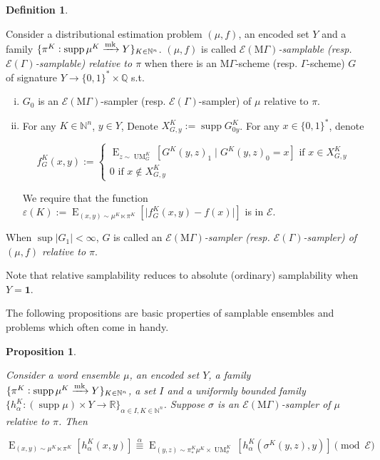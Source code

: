 \documentclass{article}
\numberwithin{equation}{section}
\theoremstyle{definition}
\newtheorem{definition}{Definition}[section]
\theoremstyle{plain}
\newtheorem{proposition}{Proposition}[section]
\newcommand{\Bool}{\{0,1\}}
\newcommand{\Words}{{\Bool^*}}
\DeclareMathOperator{\Supp}{supp}
\DeclareMathOperator{\E}{E}
\DeclareMathOperator{\UM}{UM}
\newcommand{\Nats}{\mathbb{N}}
\newcommand{\Rats}{\mathbb{Q}}
\newcommand{\Reals}{\mathbb{R}}
\newcommand{\Abs}[1]{\lvert #1 \rvert}
\newcommand{\MGrow}{\mathrm{M}\Gamma}
\newcommand{\Fall}{\mathcal{E}}
\newcommand{\EG}{\Fall(\Gamma)}
\newcommand{\EMG}{\Fall(\MGrow)}
\newcommand{\Markov}{\xrightarrow{\textnormal{mk}}}
\begin{document}
\begin{samepage}
\begin{definition}
\label{def:smp_prob_rel}

Consider a distributional estimation problem $(\mu,f)$, an encoded set $Y$ and a family $\{\pi^K: \Supp \mu^{K} \Markov Y\}_{K \in \Nats^n}$. $(\mu,f)$ is called \emph{$\EMG$-samplable (resp. $\EG$-samplable) relative to $\pi$} when there is an $\MGrow$-scheme (resp. $\Gamma$-scheme) $G$ of signature $Y \rightarrow \Words \times \Rats$ s.t.

\begin{enumerate}[(i)]

\item $G_0$ is an $\EMG$-sampler (resp. $\EG$-sampler) of $\mu$ relative to $\pi$.

\item For any $K \in \Nats^n$, $y \in Y$, Denote $X_{G,y}^K:=\Supp G_{0y}^K$. For any ${x \in \Words}$, denote 

$$f_G^K(x,y):=\begin{cases}\E_{z \sim\UM_G^K}[G^K(y,z)_1 \mid G^K(y,z)_0 = x] \text{ if } x \in X_{G,y}^K \\ 0 \text{ if } x \not\in X_{G,y}^K \end{cases}$$

We require that the function ${\varepsilon(K):=\E_{(x,y) \sim \mu^{K} \ltimes \pi^K}[\Abs{f_G^K(x,y)-f(x)}]}$ is in $\Fall$.

\end{enumerate}

When $\sup{\Abs{G_1}} < \infty$, $G$ is called an \emph{$\EMG$-sampler (resp. $\EG$-sampler) of $(\mu,f)$ relative to $\pi$}.

\end{definition}
\end{samepage}

Note that relative samplability reduces to absolute (ordinary) samplability when $Y=\bm{1}$.

The following propositions are basic properties of samplable ensembles and problems which often come in handy.

\begin{samepage}
\begin{proposition}
\label{prp:smp}

Consider a word ensemble $\mu$, an encoded set $Y$, a family ${\{\pi^K: \Supp \mu^{K} \Markov Y\}_{K \in \Nats^n}}$, a set ${I}$ and a uniformly bounded family ${\{h_\alpha^K: (\Supp \mu) \times Y \rightarrow \Reals\}_{\alpha \in I, K \in \Nats^n}}$. Suppose $\sigma$ is an $\EMG$-sampler of $\mu$ relative to $\pi$. Then

\begin{equation}
\label{eqn:prp__smp}
\E_{(x,y) \sim \mu^{K} \ltimes \pi^K}[h_\alpha^K(x,y)] \overset{\alpha}{\equiv} \E_{(y,z) \sim \pi_*^K\mu^{K} \times \UM_\sigma^K}[h_\alpha^K(\sigma^K(y,z),y)] \pmod \Fall
\end{equation}

\end{proposition}
\end{samepage}
\end{document}
